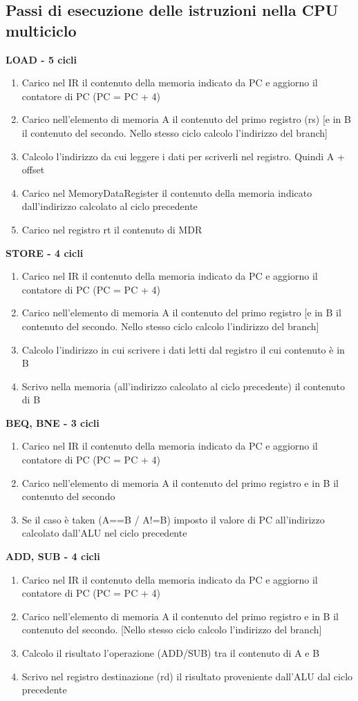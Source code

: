 \documentclass[italian]{article}
\begin{document}
	\subsection{Passi di esecuzione delle istruzioni nella CPU multiciclo}
	\textbf{LOAD - 5 cicli}
	\begin{enumerate}[noitemsep, label=\arabic*)]
		\item Carico nel IR il contenuto della memoria indicato da PC e aggiorno il contatore di PC (PC = PC + 4)
		\item Carico nell’elemento di memoria A il contenuto del primo registro (rs) [e in B il contenuto del secondo. Nello stesso ciclo calcolo l’indirizzo del branch]
		\item Calcolo l’indirizzo da cui leggere i dati per scriverli nel registro. Quindi A + offset
		\item Carico nel MemoryDataRegister il contenuto della memoria indicato dall’indirizzo calcolato al ciclo precedente
		\item Carico nel registro rt il contenuto di MDR
	\end{enumerate}
	\textbf{STORE - 4 cicli}
	\begin{enumerate}[noitemsep, label=\arabic*)]
		\item Carico nel IR il contenuto della memoria indicato da PC e aggiorno il contatore di PC (PC = PC + 4)
		\item Carico nell’elemento di memoria A il contenuto del primo registro [e in B il contenuto del secondo. Nello stesso ciclo calcolo l’indirizzo del branch]
		\item Calcolo l’indirizzo in cui scrivere i dati letti dal registro il cui contenuto è in B
		\item Scrivo nella memoria (all'indirizzo calcolato al ciclo precedente) il contenuto di B
	\end{enumerate}	
	\textbf{BEQ, BNE - 3 cicli}
	\begin{enumerate}[noitemsep, label=\arabic*)]
		\item Carico nel IR il contenuto della memoria indicato da PC e aggiorno il contatore di PC (PC = PC + 4)
		\item Carico nell’elemento di memoria A il contenuto del primo registro e in B il contenuto del secondo
		\item Se il caso è taken (A==B / A!=B) imposto il valore di PC all’indirizzo calcolato dall’ALU nel ciclo precedente
	\end{enumerate}
	\textbf{	ADD, SUB - 4 cicli}
	\begin{enumerate}[noitemsep, label=\arabic*)]
		\item Carico nel IR il contenuto della memoria indicato da PC e aggiorno il contatore di PC (PC = PC + 4)
		\item Carico nell’elemento di memoria A il contenuto del primo registro e in B il contenuto del secondo. [Nello stesso ciclo calcolo l’indirizzo del branch]
		\item Calcolo il risultato l’operazione (ADD/SUB) tra il contenuto di A e B
		\item Scrivo nel registro destinazione (rd) il risultato proveniente dall'ALU dal ciclo precedente
	\end{enumerate}
\end{document}

